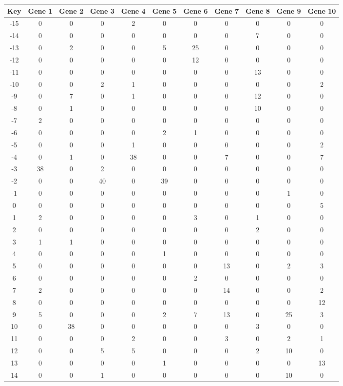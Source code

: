 \begin{tabular}{|c|c|c|c|c|c|c|c|c|c|c|}
\hline
Key & Gene 1 & Gene 2 & Gene 3 & Gene 4 & Gene 5 & Gene 6 & Gene 7 & Gene 8 & Gene 9 & Gene 10 \\
\hline
-15 & 0 & 0 & 0 & 2 & 0 & 0 & 0 & 0 & 0 & 0 \\
-14 & 0 & 0 & 0 & 0 & 0 & 0 & 0 & 7 & 0 & 0 \\
-13 & 0 & 2 & 0 & 0 & 5 & 25 & 0 & 0 & 0 & 0 \\
-12 & 0 & 0 & 0 & 0 & 0 & 12 & 0 & 0 & 0 & 0 \\
-11 & 0 & 0 & 0 & 0 & 0 & 0 & 0 & 13 & 0 & 0 \\
-10 & 0 & 0 & 2 & 1 & 0 & 0 & 0 & 0 & 0 & 2 \\
-9 & 0 & 7 & 0 & 1 & 0 & 0 & 0 & 12 & 0 & 0 \\
-8 & 0 & 1 & 0 & 0 & 0 & 0 & 0 & 10 & 0 & 0 \\
-7 & 2 & 0 & 0 & 0 & 0 & 0 & 0 & 0 & 0 & 0 \\
-6 & 0 & 0 & 0 & 0 & 2 & 1 & 0 & 0 & 0 & 0 \\
-5 & 0 & 0 & 0 & 1 & 0 & 0 & 0 & 0 & 0 & 2 \\
-4 & 0 & 1 & 0 & 38 & 0 & 0 & 7 & 0 & 0 & 7 \\
-3 & 38 & 0 & 2 & 0 & 0 & 0 & 0 & 0 & 0 & 0 \\
-2 & 0 & 0 & 40 & 0 & 39 & 0 & 0 & 0 & 0 & 0 \\
-1 & 0 & 0 & 0 & 0 & 0 & 0 & 0 & 0 & 1 & 0 \\
0 & 0 & 0 & 0 & 0 & 0 & 0 & 0 & 0 & 0 & 5 \\
1 & 2 & 0 & 0 & 0 & 0 & 3 & 0 & 1 & 0 & 0 \\
2 & 0 & 0 & 0 & 0 & 0 & 0 & 0 & 2 & 0 & 0 \\
3 & 1 & 1 & 0 & 0 & 0 & 0 & 0 & 0 & 0 & 0 \\
4 & 0 & 0 & 0 & 0 & 1 & 0 & 0 & 0 & 0 & 0 \\
5 & 0 & 0 & 0 & 0 & 0 & 0 & 13 & 0 & 2 & 3 \\
6 & 0 & 0 & 0 & 0 & 0 & 2 & 0 & 0 & 0 & 0 \\
7 & 2 & 0 & 0 & 0 & 0 & 0 & 14 & 0 & 0 & 2 \\
8 & 0 & 0 & 0 & 0 & 0 & 0 & 0 & 0 & 0 & 12 \\
9 & 5 & 0 & 0 & 0 & 2 & 7 & 13 & 0 & 25 & 3 \\
10 & 0 & 38 & 0 & 0 & 0 & 0 & 0 & 3 & 0 & 0 \\
11 & 0 & 0 & 0 & 2 & 0 & 0 & 3 & 0 & 2 & 1 \\
12 & 0 & 0 & 5 & 5 & 0 & 0 & 0 & 2 & 10 & 0 \\
13 & 0 & 0 & 0 & 0 & 1 & 0 & 0 & 0 & 0 & 13 \\
14 & 0 & 0 & 1 & 0 & 0 & 0 & 0 & 0 & 10 & 0 \\
\hline
\end{tabular}